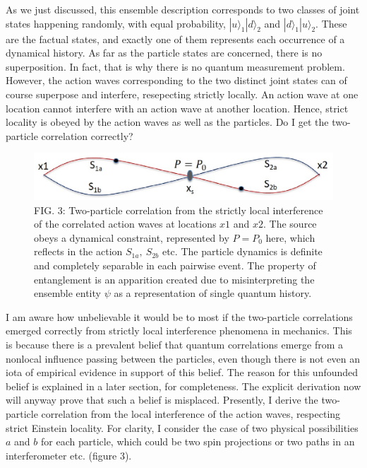 As we just discussed, this ensemble description corresponds to two classes of joint states
happening randomly, with equal probability, $|u \rangle_1 |d \rangle_2$ and $|d \rangle_1 |u \rangle_2$. These are the factual
states, and exactly one of them represents each occurrence of a dynamical history. As far
as the particle states are concerned, there is no superposition. In fact, that is why there
is no quantum measurement problem. However, the action waves corresponding to the two
distinct joint states can of course superpose and interfere, resepecting strictly locally. An
action wave at one location cannot interfere with an action wave at another location. Hence,
strict locality is obeyed by the action waves as well as the particles. Do I get the two-particle
correlation correctly?
\begin{figure}[H]
\centering
\includegraphics[scale=0.55]{src/images/chap27/3.eps}
\caption{FIG. 3: Two-particle correlation from the strictly local interference of the correlated action waves at
locations $x1$ and $x2$. The source obeys a dynamical constraint, represented by $P = P_0$ here, which
reflects in the action $S_{1a}, ~S_{2b}$ etc. The particle dynamics is definite and completely separable in
each pairwise event. The property of entanglement is an apparition created due to misinterpreting
the ensemble entity $\psi$ as a representation of single quantum history.}
\end{figure}

I am aware how unbelievable it would be to most if the two-particle correlations emerged
correctly from strictly local interference phenomena in mechanics. This is because there is a
prevalent belief that quantum correlations emerge from a nonlocal influence passing between
the particles, even though there is not even an iota of empirical evidence in support of this
belief. The reason for this unfounded belief is explained in a later section, for completeness.
The explicit derivation now will anyway prove that such a belief is misplaced. Presently, I
derive the two-particle correlation from the local interference of the action waves, respecting
strict Einstein locality. For clarity, I consider the case of two physical possibilities $a$ and $b$
for each particle, which could be two spin projections or two paths in an interferometer etc.
(figure 3).

